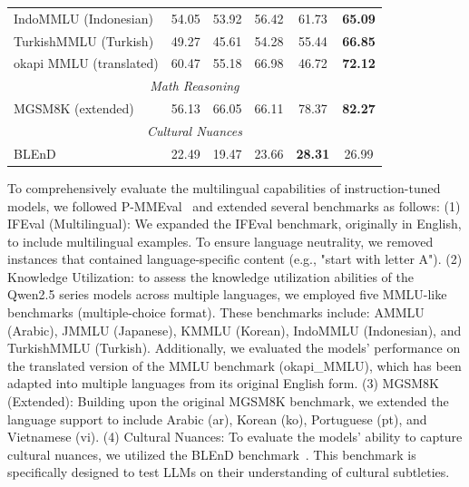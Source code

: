 \documentclass{article}
\begin{document}
\begin{table}[t]
\begin{tabular}{@{}lccccc@{}}
IndoMMLU (Indonesian) & 54.05 & 53.92 & 56.42 & 61.73 & \textbf{65.09} \\

TurkishMMLU (Turkish) & 49.27 & 45.61 & 54.28 & 55.44 & \textbf{66.85} \\

okapi MMLU (translated) & 60.47 & 55.18 & 66.98 & 46.72 & \textbf{72.12} \\

\midrule

\multicolumn{6}{c}{\textit{Math Reasoning}} \\

\midrule

MGSM8K (extended) & 56.13 & 66.05 & 66.11 & 78.37 & \textbf{82.27} \\

\midrule

\multicolumn{6}{c}{\textit{Cultural Nuances}} \\

\midrule

BLEnD & 22.49 & 19.47 & 23.66 & \textbf{28.31} & 26.99 \\

\bottomrule

\end{tabular}

\end{table}

To comprehensively evaluate the multilingual capabilities of instruction-tuned models, we followed P-MMEval~\citep{pmmeval} and extended several benchmarks as follows:
(1) IFEval (Multilingual): We expanded the IFEval benchmark, originally in English, to include multilingual examples. To ensure language neutrality, we removed instances that contained language-specific content (e.g., "start with letter A"). 
(2) Knowledge Utilization: to assess the knowledge utilization abilities of the Qwen2.5 series models across multiple languages, we employed five MMLU-like benchmarks (multiple-choice format). These benchmarks include: AMMLU (Arabic), JMMLU (Japanese), KMMLU (Korean), IndoMMLU (Indonesian), and TurkishMMLU (Turkish). 
Additionally, we evaluated the models' performance on the translated version of the MMLU benchmark (okapi\_MMLU), which has been adapted into multiple languages from its original English form.
(3) MGSM8K (Extended): Building upon the original MGSM8K benchmark, we extended the language support to include Arabic (ar), Korean (ko), Portuguese (pt), and Vietnamese (vi). 
(4) Cultural Nuances: To evaluate the models' ability to capture cultural nuances, we utilized the BLEnD benchmark~\citep{blend}. This benchmark is specifically designed to test LLMs on their understanding of cultural subtleties. 
\end{document}
